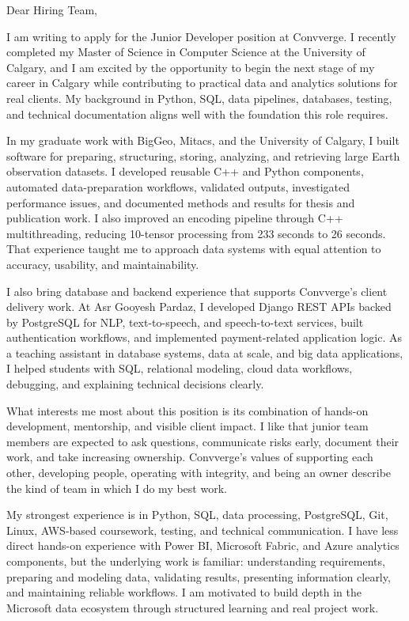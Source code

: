 \documentclass[11pt]{letter}
\begin{document}
\begin{letter}{}

\opening{Dear Hiring Team,}

I am writing to apply for the Junior Developer position at Convverge. I recently completed my Master of Science in Computer Science at the University of Calgary, and I am excited by the opportunity to begin the next stage of my career in Calgary while contributing to practical data and analytics solutions for real clients. My background in Python, SQL, data pipelines, databases, testing, and technical documentation aligns well with the foundation this role requires.

In my graduate work with BigGeo, Mitacs, and the University of Calgary, I built software for preparing, structuring, storing, analyzing, and retrieving large Earth observation datasets. I developed reusable C++ and Python components, automated data-preparation workflows, validated outputs, investigated performance issues, and documented methods and results for thesis and publication work. I also improved an encoding pipeline through C++ multithreading, reducing 10-tensor processing from 233 seconds to 26 seconds. That experience taught me to approach data systems with equal attention to accuracy, usability, and maintainability.

I also bring database and backend experience that supports Convverge's client delivery work. At Asr Gooyesh Pardaz, I developed Django REST APIs backed by PostgreSQL for NLP, text-to-speech, and speech-to-text services, built authentication workflows, and implemented payment-related application logic. As a teaching assistant in database systems, data at scale, and big data applications, I helped students with SQL, relational modeling, cloud data workflows, debugging, and explaining technical decisions clearly.

What interests me most about this position is its combination of hands-on development, mentorship, and visible client impact. I like that junior team members are expected to ask questions, communicate risks early, document their work, and take increasing ownership. Convverge's values of supporting each other, developing people, operating with integrity, and being an owner describe the kind of team in which I do my best work.

My strongest experience is in Python, SQL, data processing, PostgreSQL, Git, Linux, AWS-based coursework, testing, and technical communication. I have less direct hands-on experience with Power BI, Microsoft Fabric, and Azure analytics components, but the underlying work is familiar: understanding requirements, preparing and modeling data, validating results, presenting information clearly, and maintaining reliable workflows. I am motivated to build depth in the Microsoft data ecosystem through structured learning and real project work.


\end{letter}
\end{document}
